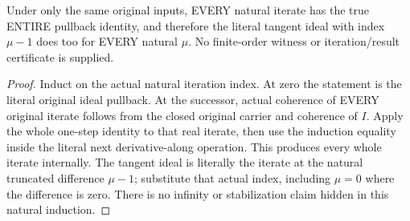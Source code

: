 \begin{theorem}
\label{hir:submersion-relative-differential-whole-iterations}
\leanok
Under only the same original inputs, EVERY natural iterate has the true
ENTIRE pullback identity, and therefore the literal tangent ideal with
index $\mu-1$ does too for EVERY natural $\mu$. No finite-order witness or
iteration/result certificate is supplied.
\end{theorem}
\begin{proof}
Induct on the actual natural iteration index. At zero the statement is the
literal original ideal pullback. At the successor, actual coherence of EVERY
original iterate follows from the closed original carrier and coherence of
$I$. Apply the whole one-step identity to that real iterate, then use the
induction equality inside the literal next derivative-along operation. This
produces every whole iterate internally. The tangent ideal is literally the
iterate at the natural truncated difference $\mu-1$; substitute that actual
index, including $\mu=0$ where the difference is zero. There is no infinity
or stabilization claim hidden in this natural induction.
\end{proof}

